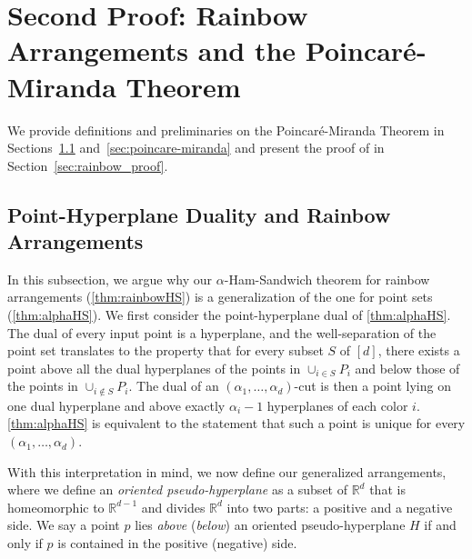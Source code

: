 \documentclass[a4paper,UKenglish,cleveref, autoref, thm-restate, nolineno]{socg-lipics-v2021}
\newcommand{\R}{\mathbb{R}}
\begin{document}
\section{Second Proof: Rainbow Arrangements and the Poincar\'{e}-Miranda Theorem}
\label{sec:rainbow}

We provide definitions and preliminaries on the Poincar\'{e}-Miranda Theorem in Sections~\ref{sec:rainbow_definition} and~\ref{sec:poincare-miranda} and present the proof of  in Section~\ref{sec:rainbow_proof}.

\subsection{Point-Hyperplane Duality and Rainbow Arrangements}
\label{sec:rainbow_definition}

In this subsection, we argue why our $\alpha$-Ham-Sandwich theorem for rainbow arrangements (\cref{thm:rainbowHS}) is a generalization of the one for point sets (\cref{thm:alphaHS}).
We first consider the point-hyperplane dual of \cref{thm:alphaHS}.
The dual of every input point is a hyperplane, and the well-separation of the point set translates to the property that for every subset $S$ of $[d]$, there exists a point above all the dual hyperplanes of the points in $\cup_{i \in S} P_i$ and below those of the points in $\cup_{i \notin S} P_i$.
The dual of an $(\alpha_1, \dots, \alpha_d)$-cut is then a point lying on one dual hyperplane and above exactly $\alpha_i-1$ hyperplanes of each color $i$.
\cref{thm:alphaHS} is equivalent to the statement that such a point is unique for every $(\alpha_1, \dots, \alpha_d)$.

With this interpretation in mind, we now define our generalized arrangements, where we define an \emph{oriented pseudo-hyperplane} as a subset of $\R^d$ that is homeomorphic to $\R^{d - 1}$ and divides $\R^d$ into two parts: a positive and a negative side. We say a point $p$ lies \emph{above} (\emph{below}) an oriented pseudo-hyperplane $H$ if and only if $p$ is contained in the positive (negative) side.
\end{document}
